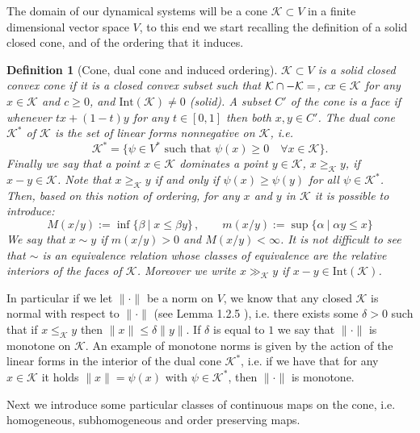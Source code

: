 \documentclass{article}
\newtheorem{definition}[theorem]{Definition}
\newcommand{\cone}{\mathcal{K}}
\newcommand{\interior}{\mathrm{Int}}
\newcommand{\cgeq}{\geq_{\cone}}
\newcommand{\cleq}{\leq_{\cone}}
\newcommand{\cgg}{\gg_{\cone}}
\begin{document}
The domain of our dynamical systems will be a cone $\cone\subset V$ in a finite dimensional vector space $V$, to this end we start recalling the definition of a solid closed cone, and of the ordering that it induces.
%
\begin{definition}[Cone, dual cone and induced ordering]
    $\cone\subset V$ is a solid closed convex cone if it is a closed convex subset such that $\cone \cap -\cone=\empty$, $c x\in \cone$ for any $x\in \cone$ and $c\geq 0$, and $\mathrm{Int}(\cone)\neq 0$ (solid). A subset $C'$ of the cone is a face if whenever $ tx+(1-t)y$ for any $t\in[0,1]$ then both $x,y\in C'$. 
%
%   
    The dual cone $\cone^*$ of $\cone$ is the set of linear forms nonnegative on $\cone$, i.e.
    $$\cone^*=\{\psi \in V^* \text{ such that } \psi(x)\geq 0 \quad \forall x\in \cone\}.$$
%
%
    Finally we say that a point $x\in \cone$ dominates a point $y\in \cone$, $x\cgeq y$, if $x-y\in \cone$. Note that $x\cgeq y$ if and only if $\psi(x)\geq \psi(y)$ for all $\psi\in \cone^*$. 
    Then, based on this notion of ordering, for any $x$ and $y$ in $\cone$ it is possible to introduce:
%
    \begin{equation}
M(x/y):=\inf \{\beta\:|\; x\leq \beta y\}\,,\qquad m(x/y):=\sup\{\alpha\:|\;\alpha y\leq x\} 
\end{equation}
We say that $x\sim y$ if $m(x/y)>0$ and $M(x/y)<\infty$. It is not difficult to see that $\sim$ is an equivalence relation whose classes of equivalence are the relative interiors of the faces of $\cone$. Moreover we write $x\cgg y$ if $x-y\in \interior(\cone)$.
\end{definition}
%
In particular if we let $\|\cdot\|$ be a norm on $V$, we know that any closed $\cone$ is normal with respect to $\|\cdot\|$ (see Lemma 1.2.5 \cite{lemmens2012nonlinear}), i.e. there exists some $\delta>0$ such that if $x\cleq y$ then $\|x\|\leq \delta\|y\|$. If $\delta$ is equal to $1$ we say that $\|\cdot\|$ is monotone on $\cone$. An example of monotone norms is given by the action of the linear forms in the interior of the dual cone $\cone^*$, i.e. if we have that for any $x\in \cone$ it holds $\|x\|=\psi(x)$ with $\psi\in \cone^*$, then $\|\cdot\|$ is monotone. 


%
Next we introduce some particular classes of continuous maps on the cone, i.e. homogeneous, subhomogeneous and order preserving maps.
\end{document}
